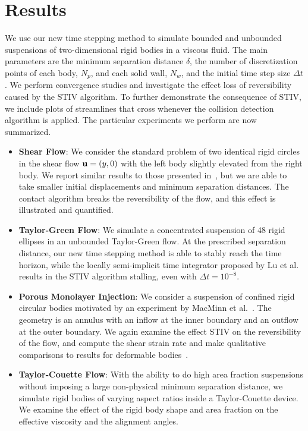 \documentclass[preprint, 10pt]{elsarticle}
\begin{document}
\section{Results\label{s:results}} 
We use our new time stepping method to simulate bounded and unbounded
suspensions of two-dimensional rigid bodies in a viscous fluid.  The
main parameters are the minimum separation distance $\delta$, the number
of discretization points of each body, $N_p$, and each solid wall,
$N_w$, and the initial time step size $\Delta t$. We perform convergence
studies and investigate the effect loss of reversibility caused by the
STIV algorithm.  To further demonstrate the consequence of STIV, we
include plots of streamlines that cross whenever the collision detection
algorithm is applied.  The particular experiments we perform are now
summarized.
\begin{itemize}
  \item {\bf Shear Flow}: We consider the standard problem of two
  identical rigid circles in the shear flow ${\mathbf{u}} = (y,0)$ with the left
  body slightly elevated from the right body.  We report similar results
  to those presented in~\cite{Lu2017}, but we are able to take smaller
  initial displacements and minimum separation distances.  The contact
  algorithm breaks the reversibility of the flow, and this effect is
  illustrated and quantified.

  \item {\bf Taylor-Green Flow}: We simulate a concentrated suspension
  of 48 rigid ellipses in an unbounded Taylor-Green flow. At the
  prescribed separation distance, our new time stepping method is able
  to stably reach the time horizon, while the locally semi-implicit time
  integrator proposed by Lu et al.~\cite{Lu2017} results in the STIV
  algorithm stalling, even with $\Delta t = 10^{-8}$.

  \item {\bf Porous Monolayer Injection}: We consider a suspension of
  confined rigid circular bodies motivated by an experiment by MacMinn
  et al.~\cite{MacMinn2015}.  The geometry is an annulus with an inflow
  at the inner boundary and an outflow at the outer boundary.  We again
  examine the effect STIV on the reversibility of the flow, and compute
  the shear strain rate and make qualitative comparisons to results for
  deformable bodies~\cite{MacMinn2015}.

  \item {\bf Taylor-Couette Flow}: With the ability to do high area
  fraction suspensions without imposing a large non-physical minimum
  separation distance, we simulate rigid bodies of varying aspect ratios
  inside a Taylor-Couette device.  We examine the effect of the rigid
  body shape and area fraction on the effective viscosity and the
  alignment angles.
\end{itemize}
\end{document}
